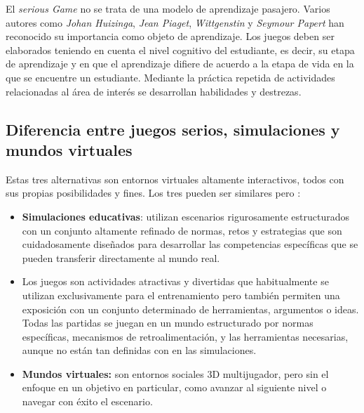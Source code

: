 El \emph{serious Game} no se trata de una modelo de aprendizaje pasajero. Varios
autores como \emph{Johan Huizinga}, \emph{Jean Piaget}, \emph{Wittgenstin} y
\emph{Seymour Papert} han reconocido su importancia  como objeto de aprendizaje.
Los juegos deben ser elaborados teniendo en cuenta el nivel cognitivo del
estudiante, es decir, su etapa de aprendizaje y en que el aprendizaje difiere de
acuerdo a la etapa de vida en la que se encuentre un estudiante. Mediante la
práctica repetida de actividades relacionadas al área de interés se desarrollan
habilidades y destrezas\cite{education:games}. 


\subsection{Diferencia entre juegos serios, simulaciones y mundos virtuales}

Estas tres alternativas son entornos virtuales altamente interactivos, todos con
sus propias posibilidades y fines. Los tres pueden ser similares pero
\cite{education:games}:

\begin{itemize}
\item \textbf{Simulaciones educativas}: utilizan escenarios rigurosamente
    estructurados con un conjunto altamente refinado de normas, retos y
    estrategias que son cuidadosamente diseñados para desarrollar las
    competencias específicas que se pueden transferir directamente al mundo
    real.
\item Los juegos son actividades atractivas y divertidas que habitualmente se
    utilizan exclusivamente para el entrenamiento pero también permiten una
    exposición con un conjunto determinado de herramientas, argumentos o ideas.
    Todas las partidas se juegan en un mundo estructurado por normas
    específicas, mecanismos de retroalimentación, y las herramientas necesarias,
    aunque no están tan definidas con en las simulaciones.
\item \textbf{Mundos virtuales:} son entornos sociales 3D multijugador, pero sin
    el enfoque en un objetivo en particular, como avanzar al siguiente nivel o
    navegar con éxito el escenario.
\end{itemize}

